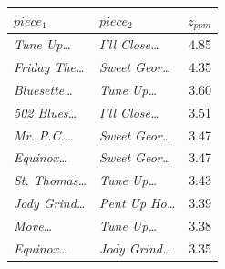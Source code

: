 \begin{tabular}{llr}
\toprule
$piece_1$ & $piece_2$ & $z_{ppm}$ \\
\midrule
\textit{Tune Up\dots} & \textit{I'll Close\dots} & 4.85 \\
\textit{Friday The\dots} & \textit{Sweet Geor\dots} & 4.35 \\
\textit{Bluesette\dots} & \textit{Tune Up\dots} & 3.60 \\
\textit{502 Blues\dots} & \textit{I'll Close\dots} & 3.51 \\
\textit{Mr. P.C.\dots} & \textit{Sweet Geor\dots} & 3.47 \\
\textit{Equinox\dots} & \textit{Sweet Geor\dots} & 3.47 \\
\textit{St. Thomas\dots} & \textit{Tune Up\dots} & 3.43 \\
\textit{Jody Grind\dots} & \textit{Pent Up Ho\dots} & 3.39 \\
\textit{Move\dots} & \textit{Tune Up\dots} & 3.38 \\
\textit{Equinox\dots} & \textit{Jody Grind\dots} & 3.35 \\
\bottomrule
\end{tabular}
